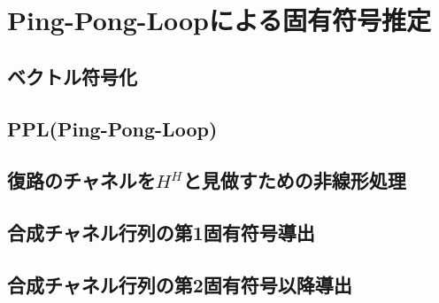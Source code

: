 \chapter{Ping-Pong-Loopによる固有符号推定}

\section{ベクトル符号化}

\section{PPL(Ping-Pong-Loop)}

\section{復路のチャネルを$H^H$と見做すための非線形処理}

\section{合成チャネル行列の第1固有符号導出}

\section{合成チャネル行列の第2固有符号以降導出}
